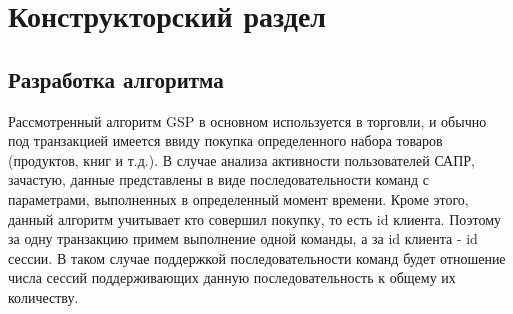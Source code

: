 \chapter{Конструкторский раздел}
\label{cha:design}

\section{Разработка алгоритма}
Рассмотренный алгоритм GSP в основном используется в торговли, и обычно под транзакцией имеется ввиду покупка определенного набора товаров (продуктов, книг и т.д.). В случае анализа активности пользователей САПР, зачастую, данные представлены в виде последовательности команд с параметрами, выполненных в определенный момент времени. Кроме этого, данный алгоритм учитывает кто совершил покупку, то есть id клиента.
Поэтому за одну транзакцию примем выполнение одной команды, а за id клиента - id сессии. В таком случае поддержкой последовательности команд будет отношение числа сессий поддерживающих данную последовательность к общему их количеству. 


